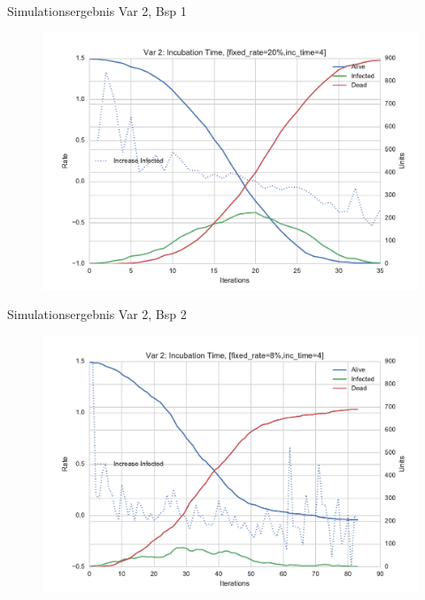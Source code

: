 \begin{frame}[fragile]{Simulationsergebnis Var 2, Bsp 1}
    	\begin{figure}[h!]
    	\includegraphics[scale=0.5]{BSP27_Plot_3.pdf}
		\end{figure}
\end{frame}

\begin{frame}[fragile]{Simulationsergebnis Var 2, Bsp 2}
    	\begin{figure}[h!]
    	\includegraphics[scale=0.5]{BSP27_Plot_4.pdf}
		\end{figure}
\end{frame}


